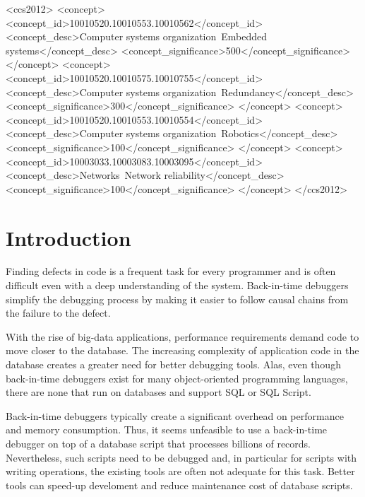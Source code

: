 \documentclass[english]{sig-alternate-05-2015}
\newcommand{\todo}[2][]{\pdfmargincomment[author={#1}]{#2}}
\begin{document}
%
%
\begin{CCSXML}
<ccs2012>
 <concept>
  <concept_id>10010520.10010553.10010562</concept_id>
  <concept_desc>Computer systems organization~Embedded systems</concept_desc>
  <concept_significance>500</concept_significance>
 </concept>
 <concept>
  <concept_id>10010520.10010575.10010755</concept_id>
  <concept_desc>Computer systems organization~Redundancy</concept_desc>
  <concept_significance>300</concept_significance>
 </concept>
 <concept>
  <concept_id>10010520.10010553.10010554</concept_id>
  <concept_desc>Computer systems organization~Robotics</concept_desc>
  <concept_significance>100</concept_significance>
 </concept>
 <concept>
  <concept_id>10003033.10003083.10003095</concept_id>
  <concept_desc>Networks~Network reliability</concept_desc>
  <concept_significance>100</concept_significance>
 </concept>
</ccs2012>  
\end{CCSXML}


\printccsdesc


\section{Introduction}

Finding defects in code is a frequent task for every programmer and is often difficult even with a deep understanding of the system.
Back-in-time debuggers simplify the debugging process \todo{cite} by making it easier to follow causal chains from the failure to the defect.

With the rise of big-data applications, performance requirements demand code to move closer to the database\todo{cite}.
The increasing complexity of application code in the database creates a greater need for better debugging tools.
Alas, even though back-in-time debuggers exist for many object-oriented programming languages\todo{cite}, there are none that run on databases and support SQL or SQL Script.

Back-in-time debuggers typically create a significant overhead on performance and memory consumption.
Thus, it seems unfeasible to use a back-in-time debugger on top of a database script that processes billions of records.
Nevertheless, such scripts need to be debugged and, in particular for scripts with writing operations, the existing tools are often not adequate for this task.
Better tools can speed-up develoment and reduce maintenance cost of database scripts.
\end{document}

